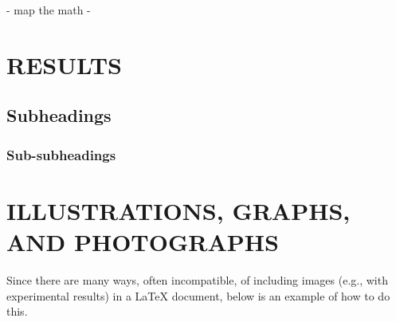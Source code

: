 \documentclass{article}
\begin{document}
- map the math
- 

%
\section{RESULTS}
\label{sec:results}
%


\subsection{Subheadings}
\label{ssec:subhead}

\subsubsection{Sub-subheadings}
\label{sssec:subsubhead}


\section{ILLUSTRATIONS, GRAPHS, AND PHOTOGRAPHS}
\label{sec:illust}

Since there are many ways, often incompatible, of including images (e.g., with
experimental results) in a LaTeX document, below is an example of how to do
this.
\end{document}
